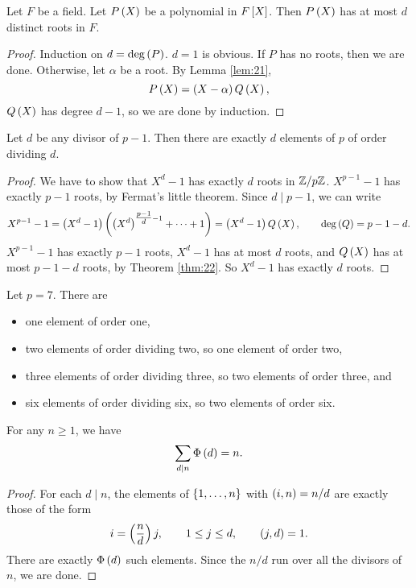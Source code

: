 \begin{theorem}
\label{thm:22}
Let $ F $ be a field. Let $ P\rb{X} $ be a polynomial in $ F\sb{X} $. Then $ P\rb{X} $ has at most $ d $ distinct roots in $ F $.
\end{theorem}

\begin{proof}
Induction on $ d = \deg\rb{P} $. $ d = 1 $ is obvious. If $ P $ has no roots, then we are done. Otherwise, let $ \alpha $ be a root. By Lemma \ref{lem:21},
$$ P\rb{X} = \rb{X - \alpha}Q\rb{X}, $$
$ Q\rb{X} $ has degree $ d - 1 $, so we are done by induction.
\end{proof}

\begin{corollary}
\label{cor:23}
Let $ d $ be any divisor of $ p - 1 $. Then there are exactly $ d $ elements of $ \unit{p} $ of order dividing $ d $.
\end{corollary}

\begin{proof}
We have to show that $ X^d - 1 $ has exactly $ d $ roots in $ \Z / p\Z $. $ X^{p - 1} - 1 $ has exactly $ p - 1 $ roots, by Fermat's little theorem. Since $ d \mid p - 1 $, we can write
$$ X^{p - 1} - 1 = \rb{X^d - 1}\rb{\rb{X^d}^{\tfrac{p - 1}{d} - 1} + \dots + 1} = \rb{X^d - 1}Q\rb{X}, \qquad \deg\rb{Q} = p - 1 - d. $$
$ X^{p - 1} - 1 $ has exactly $ p - 1 $ roots, $ X^d - 1 $ has at most $ d $ roots, and $ Q\rb{X} $ has at most $ p - 1 - d $ roots, by Theorem \ref{thm:22}. So $ X^d - 1 $ has exactly $ d $ roots.
\end{proof}

\begin{example2}
Let $ p = 7 $. There are
\begin{itemize}
\item one element of order one,
\item two elements of order dividing two, so one element of order two,
\item three elements of order dividing three, so two elements of order three, and
\item six elements of order dividing six, so two elements of order six.
\end{itemize}
\end{example2}

\begin{lemma}
\label{lem:24}
For any $ n \ge 1 $, we have
$$ \sum_{d \mid n} \Phi\rb{d} = n. $$
\end{lemma}

\begin{proof}
For each $ d \mid n $, the elements of $ \cb{1, \dots, n} $ with $ \rb{i, n} = n / d $ are exactly those of the form
$$ i = \rb{\dfrac{n}{d}}j, \qquad 1 \le j \le d, \qquad \rb{j, d} = 1. $$
There are exactly $ \Phi\rb{d} $ such elements. Since the $ n / d $ run over all the divisors of $ n $, we are done.
\end{proof}

